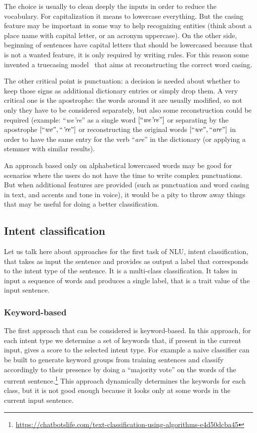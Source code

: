 The choice is usually to clean deeply the inputs in order to reduce the vocabulary. For capitalization it means to lowercase everything. But the casing feature may be important in some way to help recognizing entities (think about a place name with capital letter, or an acronym uppercase). On the other side, beginning of sentences have capital letters that should be lowercased because that is not a wanted feature, it is only required by writing rules. For this reason some invented a truecasing model~\cite{lita2003truecasing} that aims at reconstructing the correct word casing.

The other critical point is punctuation: a decision is needed about whether to keep those signs as additional dictionary entries or simply drop them. A very critical one is the apostrophe: the words around it are usually modified, so not only they have to be considered separately, but also some reconstruction could be required (example: ``\textit{we're}''  as a single word $\left[\text{``\textit{we're}''} \right]$  or separating by the apostrophe $\left[\text{``\textit{we}''}, \text{``\textit{'re}''}\right]$ or reconstructing the original words $\left[ \text{``\textit{we}''}, \text{``\textit{are}''} \right]$ in order to have the same entry for the verb ``\textit{are}'' in the dictionary (or applying a stemmer with similar results).

An approach based only on alphabetical lowercased words may be good for scenarios where the users do not have the time to write complex punctuations. But when additional features are provided (such as punctuation and word casing in text, and accents and tone in voice), it would be a pity to throw away things that may be useful for doing a better classification.

\subsection{Intent classification}
\label{soaIntent}

Let us talk here about approaches for the first task of NLU, intent classification, that takes as input the sentence and provides as output a label that corresponds to the intent type of the sentence. It is a multi-class classification. It takes in input a sequence of words and produces a single label, that is a trait value of the input sentence.

\subsubsection{Keyword-based}
The first approach that can be considered is keyword-based. In this approach, for each intent type we determine a set of keywords that, if present in the current input, gives a score to the selected intent type. For example a naive classifier can be built to generate keyword groups from training sentences and classify accordingly to their presence by doing a ``majority vote'' on the words of the current sentence.\footnote{\url{https://chatbotslife.com/text-classification-using-algorithms-e4d50dcba45}} This approach dynamically determines the keywords for each class, but it is not good enough because it looks only at some words in the current input sentence.

